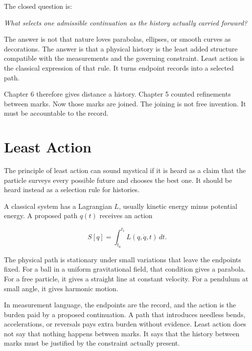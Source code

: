 \begin{chapteressay}
The closed question is:

\begin{center}
\emph{What selects one admissible continuation as the history actually carried
forward?}
\end{center}

The answer is not that nature loves parabolas, ellipses, or smooth curves as
decorations. The answer is that a physical history is the least added structure
compatible with the measurements and the governing constraint. Least action is
the classical expression of that rule. It turns endpoint records into a
selected path.

Chapter 6 therefore gives distance a history. Chapter 5 counted refinements
between marks. Now those marks are joined. The joining is not free invention.
It must be accountable to the record.

\end{chapteressay}


\section{Least Action}
\label{se:least-action}

The principle of least action can sound mystical if it is heard as a claim that
the particle surveys every possible future and chooses the best one. It should
be heard instead as a selection rule for histories.

A classical system has a Lagrangian $L$, usually kinetic energy minus potential
energy. A proposed path $q(t)$ receives an action

\[
S[q] = \int_{t_0}^{t_1} L(q,\dot q,t)\,dt.
\label{eq:chapter6-action}
\]

The physical path is stationary under small variations that leave the endpoints
fixed. For a ball in a uniform gravitational field, that condition gives a
parabola. For a free particle, it gives a straight line at constant velocity.
For a pendulum at small angle, it gives harmonic motion.

In measurement language, the endpoints are the record, and the action is the
burden paid by a proposed continuation. A path that introduces needless bends,
accelerations, or reversals pays extra burden without evidence. Least action
does not say that nothing happens between marks. It says that the history
between marks must be justified by the constraint actually present.

